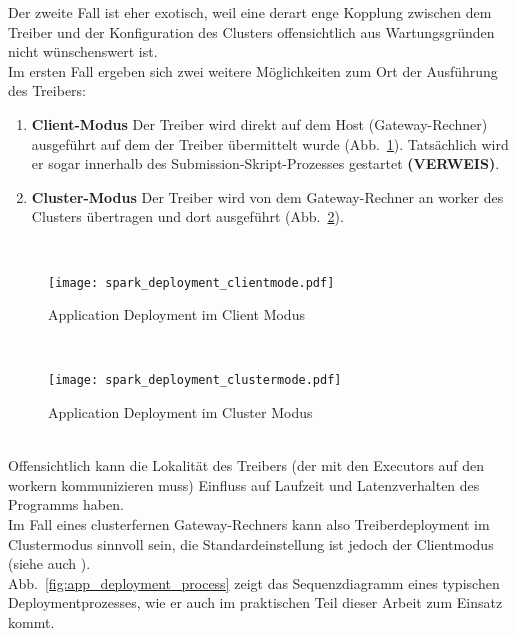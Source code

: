 Der zweite Fall ist eher exotisch, weil eine derart enge Kopplung zwischen dem Treiber und der Konfiguration des Clusters offensichtlich aus Wartungsgründen nicht wünschenswert ist.\\

Im ersten Fall ergeben sich zwei weitere Möglichkeiten zum Ort der Ausführung des Treibers:\\

\begin{enumerate}
	\item \textbf{Client-Modus}	Der Treiber wird direkt auf dem Host (Gateway-Rechner) ausgeführt auf dem der Treiber übermittelt wurde (Abb.~\ref{fig:spark_deployment_clientmode}). Tatsächlich wird er sogar innerhalb des Submission-Skript-Prozesses gestartet \textbf{(VERWEIS)}.
	\item \textbf{Cluster-Modus}	Der Treiber wird von dem Gateway-Rechner an \gls{worker} des Clusters übertragen und dort ausgeführt (Abb.~\ref{fig:spark_deployment_clustermode}).
\end{enumerate}\\

\begin{figure}[ht!]
	\centering
  \texttt{[image: spark\_deployment\_clientmode.pdf]}
	\caption{Application Deployment im Client Modus}
	\label{fig:spark_deployment_clientmode}
\end{figure}\\

\begin{figure}[ht!]
	\centering
  \texttt{[image: spark\_deployment\_clustermode.pdf]}
	\caption{Application Deployment im Cluster Modus}
	\label{fig:spark_deployment_clustermode}
\end{figure}\\

Offensichtlich kann die Lokalität des Treibers (der mit den Executors auf den \gls{worker}n kommunizieren muss) Einfluss auf Laufzeit und Latenzverhalten des Programms haben.\\

Im Fall eines clusterfernen Gateway-Rechners kann also Treiberdeployment im Clustermodus sinnvoll sein, die Standardeinstellung ist jedoch der Clientmodus (siehe auch \cite{spark_submission}).\\

Abb.~\ref{fig:app_deployment_process} zeigt das Sequenzdiagramm eines typischen Deploymentprozesses, wie er auch im praktischen Teil dieser Arbeit zum Einsatz kommt.

